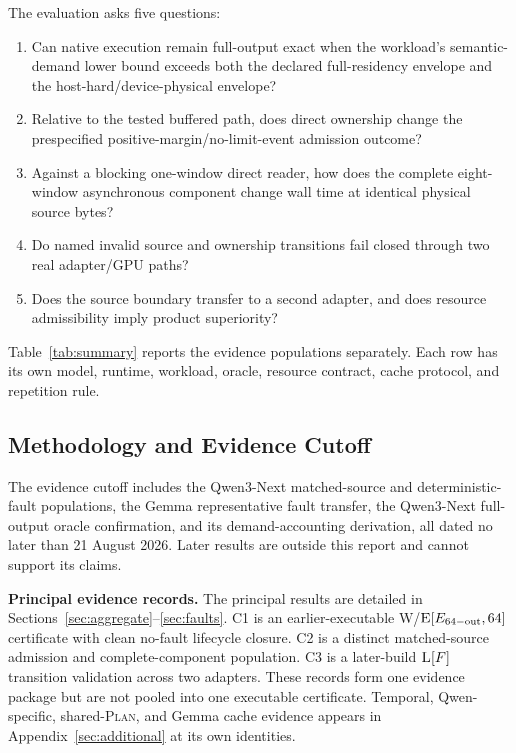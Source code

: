 \documentclass[letterpaper,twocolumn,10pt]{article}
\newcommand{\Plan}{\textsc{Plan}\xspace}
\newcommand{\para}[1]{\smallskip\noindent\textbf{#1.}}
\begin{document}
The evaluation asks five questions:

\begin{enumerate}[leftmargin=*]
  \item Can native execution remain full-output exact when the workload's
  semantic-demand lower bound exceeds both the declared full-residency envelope
  and the host-hard/device-physical envelope?
  \item Relative to the tested buffered path, does direct ownership change the
  prespecified positive-margin/no-limit-event admission outcome?
  \item Against a blocking one-window direct reader, how does the complete
  eight-window asynchronous component change wall time at identical physical
  source bytes?
  \item Do named invalid source and ownership transitions fail closed through
  two real adapter/GPU paths?
  \item Does the source boundary transfer to a second adapter, and does
  resource admissibility imply product superiority?
\end{enumerate}

Table~\ref{tab:summary} reports the evidence populations separately.  Each row
has its own model, runtime, workload, oracle, resource contract, cache protocol,
and repetition rule.

\subsection{Methodology and Evidence Cutoff}

The evidence cutoff includes the Qwen3-Next matched-source and
deterministic-fault populations, the Gemma representative fault transfer, the
Qwen3-Next full-output oracle confirmation, and its demand-accounting
derivation, all dated no later than 21 August 2026.  Later results are outside
this report and cannot support its claims.

\para{Principal evidence records}
The principal results are detailed in
Sections~\ref{sec:aggregate}--\ref{sec:faults}.  C1 is an earlier-executable
\textsc{W}/$\textsc{E}[E_{\mathrm{64-out}},64]$ certificate with clean
no-fault lifecycle closure.  C2 is a distinct matched-source admission and
complete-component population.  C3 is a later-build $\textsc{L}[F]$
transition validation across two adapters.  These records form one evidence
package but are not pooled into one executable certificate.  Temporal,
Qwen-specific, shared-\Plan, and Gemma cache evidence appears in
Appendix~\ref{sec:additional} at its own identities.
\end{document}

